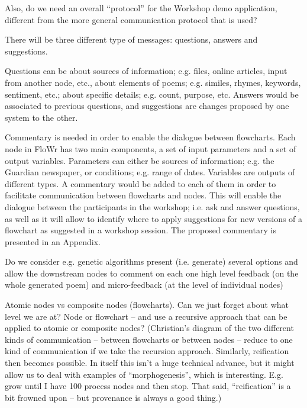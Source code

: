 \begin{mdframed}
Also, do we need an overall ``protocol'' for the Workshop demo
application, different from the more general communication protocol
that is used?

There will be three different type of messages: questions, answers and
suggestions.

Questions can be about sources of information; e.g. files, online
articles, input from another node, etc., about elements of poems;
e.g. similes, rhymes, keywords, sentiment, etc.; about specific
details; e.g. count, purpose, etc. Answers would be associated to
previous questions, and suggestions are changes proposed by one system
to the other.

Commentary is needed in order to enable the dialogue between
flowcharts. Each node in FloWr has two main components, a set of input
parameters and a set of output variables.  Parameters can either be
sources of information; e.g. the Guardian newspaper, or conditions;
e.g. range of dates. Variables are outputs of different types.  A
commentary would be added to each of them in order to facilitate
communication between flowcharts and nodes. This will enable the
dialogue between the participants in the workshop; i.e. ask and answer
questions, as well as it will allow to identify where to apply
suggestions for new versions of a flowchart as suggested in a workshop
session. The proposed commentary is presented in an Appendix.


Do we consider e.g. genetic algorithms present (i.e. generate) several
options and allow the downstream nodes to comment on each one high
level feedback (on the whole generated poem) and micro-feedback (at
the level of individual nodes)

Atomic nodes vs composite nodes (flowcharts).  Can we just forget
about what level we are at?  Node or flowchart -- and use a recursive
approach that can be applied to atomic or composite nodes?
(Christian’s diagram of the two different kinds of communication --
between flowcharts or between nodes -- reduce to one kind of
communication if we take the recursion approach.  Similarly,
reification then becomes possible.  In itself this isn’t a huge
technical advance, but it might allow us to deal with examples of
``morphogenesis'', which is interesting.  E.g. grow until I have 100
process nodes and then stop. That said, ``reification'' is a bit
frowned upon -- but provenance is always a good thing.)
\end{mdframed}



